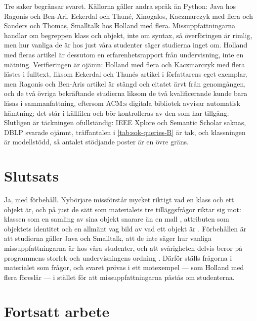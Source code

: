 Tre saker begränsar svaret.  Källorna gäller andra språk än Python:
Java hos Ragonis och Ben-Ari, Eckerdal och Thuné, Xinogalos, Kaczmarczyk
med flera och Sanders och Thomas, Smalltalk hos Holland med flera.
Missuppfattningarna handlar om begreppen klass och objekt, inte om
syntax, så överföringen är rimlig, men hur vanliga de är hos just våra
studenter säger studierna inget om.  Holland med fleras artikel är
dessutom en erfarenhetsrapport från undervisning, inte en mätning.
Verifieringen är ojämn: Holland med flera och Kaczmarczyk med flera
lästes i fulltext, liksom Eckerdal och Thunés artikel i författarens
eget exemplar, men Ragonis och Ben-Aris artikel är stängd och citatet
ärvt från genomgången, och de två övriga bekräftande studierna liksom de
två kvalificerande kunde bara läsas i sammanfattning, eftersom ACM:s
digitala bibliotek avvisar automatisk hämtning; det står i källfilen och
bör kontrolleras av den som har tillgång.  Slutligen är täckningen
ofullständig: IEEE Xplore och Semantic Scholar saknas, DBLP svarade
ojämnt, träffantalen i \cref{tab:sok-queries-B} är tak, och klassningen
är modellstödd, så antalet stödjande poster är en övre gräns.

\section{Slutsats}
\label{sec:miss-slutsats-klasser}

Ja, med förbehåll.  Nybörjare missförstår mycket riktigt vad en klass
och ett objekt är, och på just de sätt som materialets tre
tilläggsfrågor riktar sig mot: klassen som en samling av sina objekt
snarare än en mall \autocite{Ragonis2005OOP,EckerdalThune2005,Xinogalos2015},
attributen som objektets identitet \autocite{Holland1997} och en
allmänt vag bild av vad ett objekt är
\autocite{Kaczmarczyk2010,SandersThomas2007}.  Förbehållen är att
studierna gäller Java och Smalltalk, att de inte säger hur vanliga
missuppfattningarna är hos våra studenter, och att svårigheten delvis
beror på programmens storlek och undervisningens ordning
\autocite{Wiedenbeck1999,KunkleAllen2016}.  Därför ställs frågorna i
materialet som frågor, och svaret prövas i ett motexempel --- som Holland
med flera föreslår --- i stället för att missuppfattningarna påstås om
studenterna.

\section{Fortsatt arbete}
\label{sec:miss-fortsatt-klasser}


